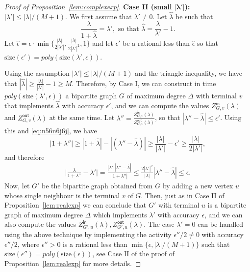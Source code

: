 \documentclass[11pt]{article}
\def\Zin{Z^{\mathsf{in}}}
\def\Zout{Z^{\mathsf{out}}}
\newcommand{\size}[1]{\mathrm{size}(#1)}
\newcommand{\eps}{\epsilon}
\begin{document}
\begin{proof}[Proof of Proposition~\ref{lem:complexexp}]
\noindent \textbf{Case II (small $\mathbf{|\lambda'|}$): $|\lambda'|\leq |\lambda|/(M+1)$}. We first assume that $\lambda'\neq 0$. Let $\hat{\lambda}$ be such that
\begin{equation}\label{eq:n56n6j6j}
\frac{\lambda}{1+\hat{\lambda}}=\lambda', \mbox{ so that } \hat{\lambda}=\frac{\lambda}{\lambda'}-1.
\end{equation}
Let $\hat{\epsilon}=\epsilon \cdot \min\big\{\frac{|\lambda|}{2|\lambda'|},\frac{|\lambda|}{2|\lambda'|^2},1\big\}$ and let $\epsilon'$ be a rational less than $\hat{\epsilon}$ so that $\size{\epsilon'}=poly(\size{\lambda',\epsilon})$.  

Using the assumption $|\lambda'|\leq |\lambda|/(M+1)$ and the triangle inequality, we have that $|\hat{\lambda}|\geq \frac{|\lambda|}{|\lambda'|}-1\geq M$.  Therefore, by Case I, we can construct in time $poly(\size{\lambda',\eps})$ a bipartite graph $G$ of maximum degree $\Delta$ with terminal $v$ that  implements $\hat{\lambda}$ with accuracy $\epsilon'$, and we can compute the values $\Zin_{G,v}(\lambda)$ and $\Zout_{G,v}(\lambda)$ at the same time.  Let $\lambda''= \frac{\Zin_{G,v}(\lambda)}{\Zout_{G,v}(\lambda)}$, so that $|\lambda''-\hat{\lambda}|\leq \epsilon'$. Using this and \eqref{eq:n56n6j6j}, we have
\begin{equation}\label{eq:b556n45y54hj}
|1+\lambda'' |\geq  |1+\hat{\lambda}|-|(\lambda''-\hat{\lambda})|\geq \frac{|\lambda|}{|\lambda'|}-\epsilon'\geq \frac{|\lambda|}{2|\lambda'|},
\end{equation}
and therefore 
\begin{equation}\label{eq:6h6h43gt3}
\begin{aligned}
\Big|\frac{\lambda}{1+\lambda'' }-\lambda'\Big|=\frac{|\lambda' ||\lambda''-\hat{\lambda}|}{|1+\lambda''|}\leq \frac{2|\lambda'|^2}{|\lambda|}|\lambda''-\hat{\lambda}|\leq \epsilon.
\end{aligned}
\end{equation}
Now,  let $G'$ be the bipartite graph obtained from $G$ by adding a new vertex $u$ whose single neighbour is the terminal $v$ of $G$. Then, just as in Case II of Proposition~\ref{lem:realexp} we can conclude that  $G'$ with terminal $u$ is a bipartite graph of maximum degree $\Delta$ which  implements $\lambda'$ with accuracy $\epsilon$, and we can also compute the values $\Zin_{G',u}(\lambda),\Zout_{G',u}(\lambda)$. The case $\lambda'=0$ can be handled using the above technique by implementing the activity $\epsilon''/2\neq 0$ with accuracy $\epsilon''/2$, where $\epsilon''>0$ is a rational less than $\min\{\epsilon,|\lambda|/(M+1)\}$ such that $\size{\epsilon''}=poly(\size{\epsilon})$, see Case II of the proof of Proposition~\ref{lem:realexp} for more details.


\end{proof}
\end{document}
